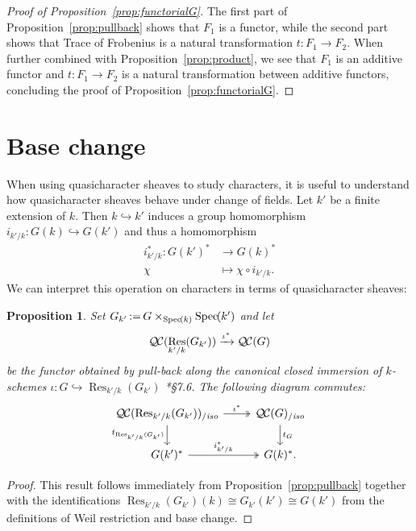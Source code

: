 \documentclass[11pt]{amsart}
\theoremstyle{plain}
\newtheorem{proposition}[theorem]{Proposition}
\theoremstyle{definition}
\theoremstyle{remark}
\newcommand{\Spec}[1]{{\operatorname{Spec}\hskip-1pt( #1 )}}
\DeclareMathOperator{\Res}{Res}
\newcommand{\ceq}{{\, :=\, }}
\newcommand{\QC}{{\mathcal{Q\hskip-0.8pt C}}}
\newcommand{\QCiso}[1]{\QC(#1)_{/\textit{iso}}}
\newcommand{\trFrob}[1]{t_{#1}}
\begin{document}
\begin{proof}[Proof of Proposition~\ref{prop:functorialG}]
The first part of Proposition~\ref{prop:pullback} shows that $F_1$ is a functor,
while the second part shows that Trace of Frobenius is a natural transformation
$t: F_1 \to F_2$. When further combined with Proposition~\ref{prop:product},
we see that $F_1$ is an additive functor and $t: F_1 \to F_2$ is a natural
transformation between additive functors, 
concluding the proof of Proposition~\ref{prop:functorialG}.
\end{proof}

\section{Base change}\label{sec:basechange}

When using quasicharacter sheaves to study characters, it is useful to understand
how quasicharacter sheaves behave under change of fields.
Let $k'$ be a finite extension of $k$. Then $k \hookrightarrow k'$ induces a group homomorphism
$i_{k'/k} : G(k) \hookrightarrow G(k')$ and thus a homomorphism
\begin{align*}
i_{k'/k}^* : G(k')^* &\to G(k)^* \\
\chi &\mapsto \chi\circ i_{k'/k}.
\end{align*}
We can interpret this operation on characters in terms of quasicharacter sheaves:
%

\begin{proposition} \label{prop:csbe}
Set $G_{k'} \ceq G\times_\Spec{k} \Spec{k'}$ and let
\[
\QC(\Res_{k'/k}(G_{k'})) \xrightarrow{\iota^*} \QC(G)
\]
be the functor obtained by pull-back along the canonical closed immersion of $k$-schemes
$\iota : G \hookrightarrow \Res_{k'/k}(G_{k'})$
\cite{bosch-lutkebohmert-reynaud:NeronModels}*{\S 7.6}. 
The following diagram commutes:
\[
\begin{tikzcd}
\QCiso{\Res_{k'/k}(G_{k'})} \arrow[two heads]{r}{\iota^*} \dar[swap]{\trFrob{\Res_{k'/k}(G_{k'})}} & \QCiso{G} \dar{\trFrob{G}} \\
G(k')^* \arrow[two heads]{r}{i_{k'/k}^*} & G(k)^*.
\end{tikzcd}
\]
\end{proposition}
\begin{proof}
This result follows immediately from Proposition~\ref{prop:pullback} together with the identifications
$\Res_{k'/k}(G_{k'})(k) \cong G_{k'}(k') \cong G(k')$ from the definitions of Weil restriction and base change.
\end{proof}
\end{document}
